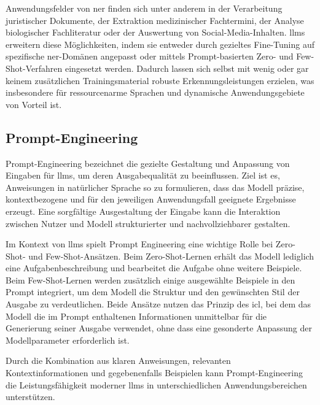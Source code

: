 Anwendungsfelder von \gls{ner} finden sich unter anderem in der Verarbeitung juristischer Dokumente\autocite{breton_empowering_2024}, der Extraktion medizinischer Fachtermini\autocite{islam_llm-based_2025}, der Analyse biologischer Fachliteratur\autocite{lee_biobert_2020} oder der Auswertung von Social-Media-Inhalten\autocite{niu_osint_2025}.
\glspl{llm} erweitern diese Möglichkeiten, indem sie entweder durch gezieltes Fine-Tuning\autocite{dunn_structured_2022} auf spezifische \gls{ner}-Domänen angepasst oder mittels Prompt-basierten Zero- und Few-Shot-Verfahren\autocite{villena_llmner_2024,cheng_novel_2024,wei_chatie_2024} eingesetzt werden.
Dadurch lassen sich selbst mit wenig oder gar keinem zusätzlichen Trainingsmaterial robuste Erkennungsleistungen erzielen, was insbesondere für ressourcenarme Sprachen und dynamische Anwendungsgebiete von Vorteil ist\autocite{pakhale_comprehensive_2023}.


\subsection{Prompt-Engineering}

Prompt-Engineering bezeichnet die gezielte Gestaltung und Anpassung von Eingaben für \glspl{llm}, um deren Ausgabequalität zu beeinflussen.
Ziel ist es, Anweisungen in natürlicher Sprache so zu formulieren, dass das Modell präzise, kontextbezogene und für den jeweiligen Anwendungsfall geeignete Ergebnisse erzeugt.
Eine sorgfältige Ausgestaltung der Eingabe kann die Interaktion zwischen Nutzer und Modell strukturierter und nachvollziehbarer gestalten\autocite{chan_generative_2024}.

Im Kontext von \glspl{llm} spielt Prompt Engineering eine wichtige Rolle bei Zero-Shot- und Few-Shot-Ansätzen.
Beim Zero-Shot-Lernen erhält das Modell lediglich eine Aufgabenbeschreibung und bearbeitet die Aufgabe ohne weitere Beispiele.
Beim Few-Shot-Lernen werden zusätzlich einige ausgewählte Beispiele in den Prompt integriert, um dem Modell die Struktur und den gewünschten Stil der Ausgabe zu verdeutlichen.
Beide Ansätze nutzen das Prinzip des \gls{icl}, bei dem das Modell die im Prompt enthaltenen Informationen unmittelbar für die Generierung seiner Ausgabe verwendet, ohne dass eine gesonderte Anpassung der Modellparameter erforderlich ist\autocite{villena_llmner_2024}.

Durch die Kombination aus klaren Anweisungen, relevanten Kontextinformationen und gegebenenfalls Beispielen kann Prompt-Engineering die Leistungsfähigkeit moderner \glspl{llm} in unterschiedlichen Anwendungsbereichen unterstützen.

